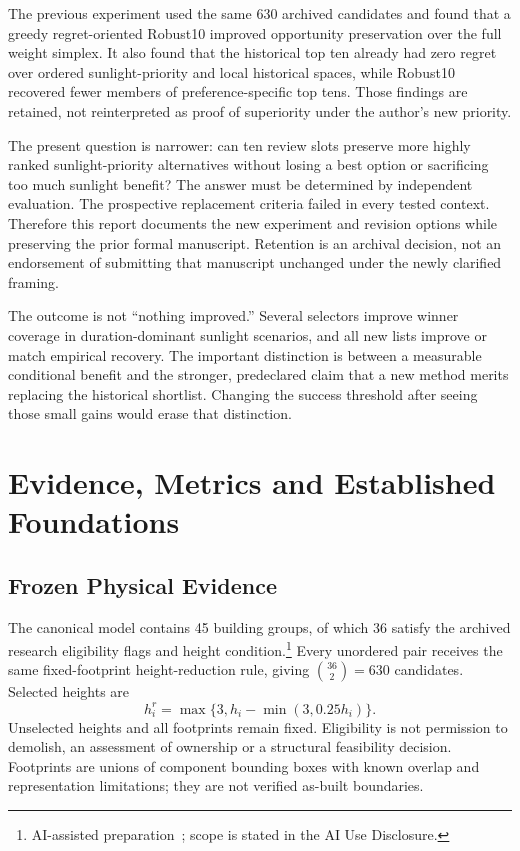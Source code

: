 \documentclass{llncs}
\newcommand{\aidraft}{\footnote{AI-assisted preparation~\cite{openai2026}; scope is stated in the AI Use Disclosure.}}
\begin{document}
The previous experiment used the same 630 archived candidates and found that a greedy regret-oriented Robust10 improved opportunity preservation over the full weight simplex. It also found that the historical top ten already had zero regret over ordered sunlight-priority and local historical spaces, while Robust10 recovered fewer members of preference-specific top tens. Those findings are retained, not reinterpreted as proof of superiority under the author's new priority.

The present question is narrower: can ten review slots preserve more highly ranked sunlight-priority alternatives without losing a best option or sacrificing too much sunlight benefit? The answer must be determined by independent evaluation. The prospective replacement criteria failed in every tested context. Therefore this report documents the new experiment and revision options while preserving the prior formal manuscript. Retention is an archival decision, not an endorsement of submitting that manuscript unchanged under the newly clarified framing.

The outcome is not ``nothing improved.'' Several selectors improve winner coverage in duration-dominant sunlight scenarios, and all new lists improve or match empirical recovery. The important distinction is between a measurable conditional benefit and the stronger, predeclared claim that a new method merits replacing the historical shortlist. Changing the success threshold after seeing those small gains would erase that distinction.

\section{Evidence, Metrics and Established Foundations}
\subsection{Frozen Physical Evidence}
The canonical model contains 45 building groups, of which 36 satisfy the archived research eligibility flags and height condition.\aidraft{} Every unordered pair receives the same fixed-footprint height-reduction rule, giving $\binom{36}{2}=630$ candidates. Selected heights are
\begin{equation}
 h_i^r=\max\{3,h_i-\min(3,0.25h_i)\}.
\end{equation}
Unselected heights and all footprints remain fixed. Eligibility is not permission to demolish, an assessment of ownership or a structural feasibility decision. Footprints are unions of component bounding boxes with known overlap and representation limitations; they are not verified as-built boundaries.
\end{document}
